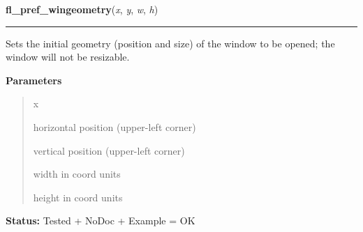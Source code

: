 \hspace{.8\funcindent}\begin{boxedminipage}{\funcwidth}

    \raggedright \textbf{fl\_pref\_wingeometry}(\textit{x}, \textit{y}, \textit{w}, \textit{h})

    \vspace{-1.5ex}

    \rule{\textwidth}{0.5\fboxrule}
\setlength{\parskip}{2ex}
    Sets the initial geometry (position and size) of the window to be 
    opened; the window will not be resizable.

\setlength{\parskip}{1ex}
      \textbf{Parameters}
      \vspace{-1ex}

      \begin{quote}
        \begin{Ventry}{x}

          \item[x]

          horizontal position (upper-left corner)

          \item[y]

          vertical position (upper-left corner)

          \item[w]

          width in coord units

          \item[h]

          height in coord units

        \end{Ventry}

      \end{quote}

\textbf{Status:} Tested + NoDoc + Example = OK



    \end{boxedminipage}

    \label{xformslib:library:fl_initial_wingeometry}

    \vspace{0.5ex}

